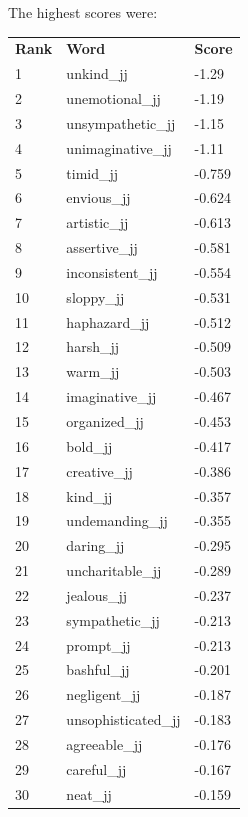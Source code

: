 \documentclass[10pt,letterpaper]{book}
\begin{document}
The highest scores were:
\begin{tabular}{ l l l }
        \textbf{Rank} & \textbf{Word} & \textbf{Score} \\
        1 & unkind\_jj & -1.29 \\
        2 & unemotional\_jj & -1.19 \\
        3 & unsympathetic\_jj & -1.15 \\
        4 & unimaginative\_jj & -1.11 \\
        5 & timid\_jj & -0.759 \\
        6 & envious\_jj & -0.624 \\
        7 & artistic\_jj & -0.613 \\
        8 & assertive\_jj & -0.581 \\
        9 & inconsistent\_jj & -0.554 \\
        10 & sloppy\_jj & -0.531 \\
        11 & haphazard\_jj & -0.512 \\
        12 & harsh\_jj & -0.509 \\
        13 & warm\_jj & -0.503 \\
        14 & imaginative\_jj & -0.467 \\
        15 & organized\_jj & -0.453 \\
        16 & bold\_jj & -0.417 \\
        17 & creative\_jj & -0.386 \\
        18 & kind\_jj & -0.357 \\
        19 & undemanding\_jj & -0.355 \\
        20 & daring\_jj & -0.295 \\
        21 & uncharitable\_jj & -0.289 \\
        22 & jealous\_jj & -0.237 \\
        23 & sympathetic\_jj & -0.213 \\
        24 & prompt\_jj & -0.213 \\
        25 & bashful\_jj & -0.201 \\
        26 & negligent\_jj & -0.187 \\
        27 & unsophisticated\_jj & -0.183 \\
        28 & agreeable\_jj & -0.176 \\
        29 & careful\_jj & -0.167 \\
        30 & neat\_jj & -0.159 \\
\end{tabular}
\end{document}
